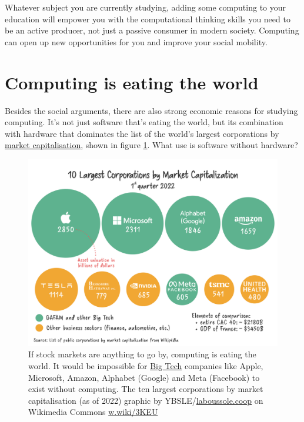 \documentclass[
]{book}
\begin{document}
Whatever subject you are currently studying, adding some computing to your education will empower you with the computational thinking skills you need to be an active producer, not just a passive consumer in modern society. Computing can open up new opportunities for you and improve your social mobility.

\hypertarget{eating}{%
\section{Computing is eating the world}\label{eating}}

Besides the social arguments, there are also strong economic reasons for studying computing. It's not just software that's eating the world, but its combination with hardware that dominates the list of the world's largest corporations by \href{https://en.wikipedia.org/wiki/Market_capitalization}{market capitalisation}, shown in figure \ref{fig:market-fig}. What use is software without hardware?

\begin{figure}

{\centering \includegraphics[width=1\linewidth]{images/Market_Capitalisation} 

}

\caption{If stock markets are anything to go by, computing is eating the world. It would be impossible for \href{https://en.wikipedia.org/wiki/Big_Tech}{Big Tech} companies like Apple, Microsoft, Amazon, Alphabet (Google) and Meta (Facebook) to exist without computing. The ten largest corporations by market capitalisation (as of 2022) graphic by YBSLE/\href{https://laboussole.coop/}{laboussole.coop} on Wikimedia Commons \href{https://w.wiki/3KEU}{w.wiki/3KEU}}\label{fig:market-fig}
\end{figure}
\end{document}
